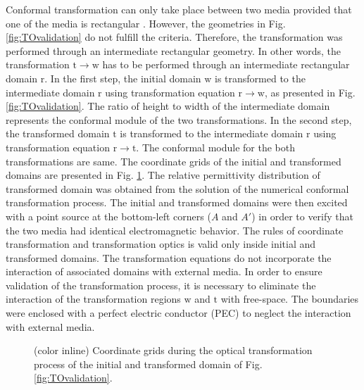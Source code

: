 Conformal transformation can only take place between two media provided that one of the media is rectangular \cite{Burokur2016}. However, the geometries in Fig. \ref{fig:TOvalidation} do not fulfill the criteria. Therefore, the transformation was performed through an intermediate rectangular geometry. In other words, the transformation $\mathrm{t} \longrightarrow \mathrm{w}$ has to be performed through an intermediate rectangular domain $\mathrm{r}$. In the first step, the initial domain $\mathrm{w}$ is transformed to the intermediate domain $\mathrm{r}$ using transformation equation $\mathrm{r} \longrightarrow \mathrm{w}$, as presented in Fig. \ref{fig:TOvalidation}. The ratio of height to width of the intermediate domain represents the conformal module of the two transformations. In the second step, the transformed domain $\mathrm{t}$ is transformed to the intermediate domain $\mathrm{r}$ using transformation equation $\mathrm{r} \longrightarrow \mathrm{t}$. The conformal module for the both transformations are same. The coordinate grids of the initial and transformed domains are presented in Fig. \ref{fig:TOvalidation2}. The relative permittivity distribution of transformed domain was obtained from the solution of the numerical conformal transformation process. The initial and transformed domains were then excited with a point source at the bottom-left corners ($A$ and $A'$) in order to verify that the two media had identical electromagnetic behavior. The rules of coordinate transformation and transformation optics is valid only inside initial and transformed domains. The transformation equations do not incorporate the interaction of associated domains with external media. In order to ensure validation of the transformation process, it is necessary to eliminate the interaction of the transformation regions $\mathrm{w}$ and $\mathrm{t}$ with free-space. The boundaries were enclosed with a perfect electric conductor (PEC) to neglect the interaction with external media. 
%
\begin{figure}[]
\centering
\noindent
  \hspace*{\fill}
  \mbox{}
  \hspace*{\fill}
 \mbox{}
 \hspace*{\fill}%
\caption[Coordinate grid lines of the transformation shown in Fig. \ref{fig:TOvalidation}.]{(color inline) Coordinate grids during the optical transformation process of the initial and transformed domain of Fig. \ref{fig:TOvalidation}.}
\label{fig:TOvalidation2}
\end{figure}
